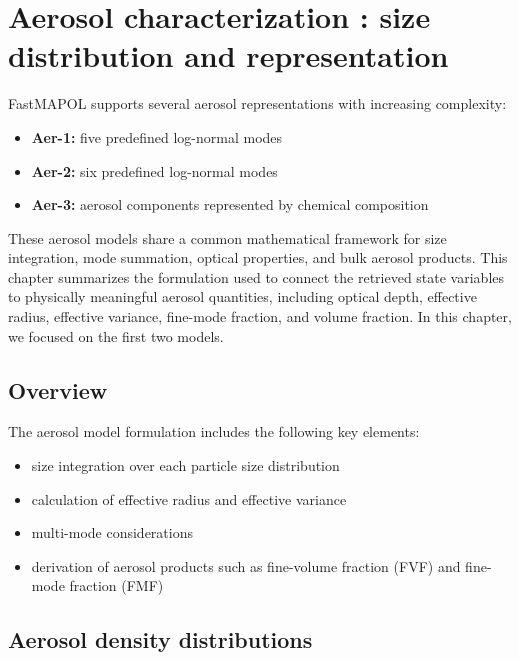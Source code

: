 \documentclass[
  letterpaper,
]{scrbook}
\providecommand{\tightlist}{%
  \setlength{\itemsep}{0pt}\setlength{\parskip}{0pt}}
\begin{document}
\chapter{Aerosol characterization : size distribution and
representation}\label{aerosol-characterization-size-distribution-and-representation}

FastMAPOL supports several aerosol representations with increasing
complexity:

\begin{itemize}
\tightlist
\item
  \textbf{Aer-1:} five predefined log-normal modes
\item
  \textbf{Aer-2:} six predefined log-normal modes
\item
  \textbf{Aer-3:} aerosol components represented by chemical composition
\end{itemize}

These aerosol models share a common mathematical framework for size
integration, mode summation, optical properties, and bulk aerosol
products. This chapter summarizes the formulation used to connect the
retrieved state variables to physically meaningful aerosol quantities,
including optical depth, effective radius, effective variance, fine-mode
fraction, and volume fraction. In this chapter, we focused on the first
two models.

\section{Overview}\label{overview-2}

The aerosol model formulation includes the following key elements:

\begin{itemize}
\tightlist
\item
  size integration over each particle size distribution
\item
  calculation of effective radius and effective variance
\item
  multi-mode considerations
\item
  derivation of aerosol products such as fine-volume fraction (FVF) and
  fine-mode fraction (FMF)
\end{itemize}

\section{Aerosol density
distributions}\label{aerosol-density-distributions}
\end{document}
